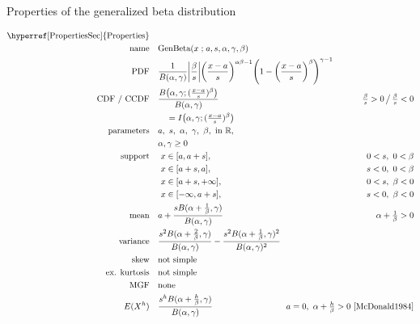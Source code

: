 

\begin{table*}[tp]
\caption[Generalized beta distribution-- Properties]{Properties of the generalized beta distribution}
 \begin{align*}
 \text{\hyperref[PropertiesSec]{Properties}}  \quad& \\
\text{name} \quad & \text{GenBeta}(x\given a,s,\alpha, \gamma,\beta) 
\\
\text{PDF}\quad &   \frac{1}{B(\alpha, \gamma)} \Left|\frac{\beta}{s}\Right|
\Left(\frac{x-a}{s} \Right)^{\alpha \beta -1} \Left(1-\Left(\frac{x-a}{s}\Right)^\beta\Right)^{\gamma -1}
\checked
\hspace{-8em}
\\
\text{CDF / CCDF} \quad  &   \frac{B\Left( \alpha,\gamma; (\tfrac{x-a}{s})^\beta  \Right)}{B(\alpha,\gamma)}
\checked
& \tfrac{\beta}{s} >0 \,\big/ \, \tfrac{\beta}{s} <0
\\ & \quad = I\Left(  \alpha,\gamma; (\tfrac{x-a}{s})^\beta \Right) \checked
\\ 
\text{parameters}\quad &   a,\ s,\ \alpha,\ \gamma,\ \beta, \text{ in } \Real, \\ &  \alpha,\gamma\geq0
\\
\text{support} \quad 
&   \ x \in [a,a+s],  \quad & 0<s,\ 0<\beta  \checked
 \\ 	 		 & \ x\in[a+s,a],  \quad & s<0,\ 0<\beta   \checked
 \\  			 & \ x\in[a+s,+\infty], \quad  & 0<s,\ \beta<0  \checked
 \\  			& \ x\in[-\infty,a+s], \quad & s<0,\ \beta<0 \checked
\\
\text{mean} \quad  &   a+ \frac{s B(\alpha+\tfrac{1}{\beta},\gamma) }{B(\alpha,\gamma)}  \quad & \alpha+\tfrac{1}{\beta} >0
\checked
\\
\text{variance} \quad  & \frac{s^2 B(\alpha+\tfrac{2}{\beta},\gamma) }{B(\alpha,\gamma)} -\frac{s^2 B(\alpha+\tfrac{1}{\beta},\gamma)^2 }{B(\alpha,\gamma)^2} \checked
\\
\text{skew} \quad  &   \text{not simple}
\\
\text{ex. kurtosis} \quad  &   \text{not simple}
\\
\text{MGF} \quad  &  \text{none} %
\\
E(X^h) \quad & \frac{s^h B(\alpha+\tfrac{h}{\beta},\gamma) }{B(\alpha,\gamma)}  \qquad  & \!\!a=0,\ \alpha+\tfrac{h}{\beta} >0
\ \text{\cite{McDonald1984}} \checked
\end{align*}
\end{table*}

